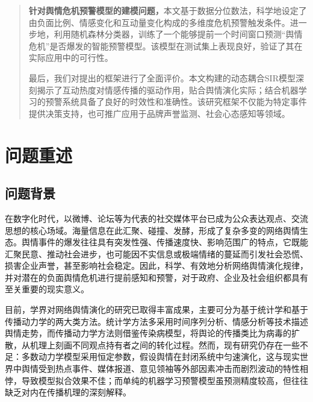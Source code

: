 \documentclass[withoutpreface,bwprint]{cumcmthesis}
\begin{document}
\begin{abstract}
\textbf{针对舆情危机预警模型的建模问题，}本文基于数据分位数法，科学地设定了由负面比例、情感变化和互动量变化构成的多维度危机预警触发条件。进一步地，利用随机森林分类器，训练了一个能够提前一个时间窗口预测“舆情危机”是否爆发的智能预警模型。该模型在测试集上表现良好，验证了其在实际应用中的可行性。

最后，我们对提出的框架进行了全面评价。本文构建的动态耦合SIR模型深刻揭示了互动热度对情感传播的驱动作用，贴合舆情演化实际；结合机器学习的预警系统具备了良好的时效性和准确性。该研究框架不仅能为特定事件提供决策支持，也可推广应用于品牌声誉监测、社会心态感知等领域。



\end{abstract}


\section{问题重述}
\subsection{问题背景}
在数字化时代，以微博、论坛等为代表的社交媒体平台已成为公众表达观点、交流思想的核心场域。海量信息在此汇聚、碰撞、发酵，形成了复杂多变的网络舆情生态。舆情事件的爆发往往具有突发性强、传播速度快、影响范围广的特点，它既能汇聚民意、推动社会进步，也可能因不实信息或极端情绪的蔓延而引发社会恐慌、损害企业声誉，甚至影响社会稳定。因此，科学、有效地分析网络舆情演化规律，并对潜在的负面舆情危机进行提前感知和预警，对于政府、企业及社会组织都具有至关重要的现实意义。

目前，学界对网络舆情演化的研究已取得丰富成果，主要可分为基于统计学和基于传播动力学的两大类方法。统计学方法多采用时间序列分析、情感分析等技术描述舆情走势，而传播动力学方法则借鉴传染病模型，将舆论的传播类比为病毒的扩散，从机理上刻画不同观点持有者之间的转化过程。然而，现有研究仍存在一些不足：多数动力学模型采用恒定参数，假设舆情在封闭系统中匀速演化，这与现实世界中舆情受到热点事件、媒体报道、意见领袖等外部因素冲击而剧烈波动的特性相悖，导致模型拟合效果不佳；而单纯的机器学习预警模型虽预测精度较高，但往往缺乏对内在传播机理的深刻解释。

\end{document}
